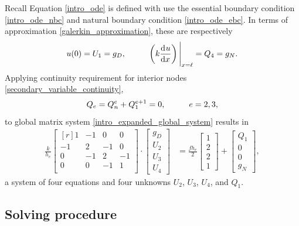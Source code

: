 Recall Equation \cref{intro_ode} is defined with use the  essential boundary condition \cref{intro_ode_nbc} and  natural boundary condition \cref{intro_ode_ebc}.  In terms of approximation \cref{galerkin_approximation}, these are respectively
$$u(0) = U_1 = g_D, \hspace{10mm} \left( k \totder{u}{x} \right) \Bigg|_{x=\ell} = Q_4 = g_N.$$
Applying continuity requirement for interior nodes \cref{secondary_variable_continuity},
$$Q_e = Q_n^e + Q_1^{e+1} = 0, \hspace{10mm} e = 2,3,$$
to global matrix system \cref{intro_expanded_global_system} results in
\begin{align}
  \label{intro_final_global_system}
  \frac{k}{h_e}
  \begin{bmatrix}[r]
     1 & -1 &  0 &  0 \\
    -1 &  2 & -1 &  0 \\
     0 & -1 &  2 & -1 \\
     0 &  0 & -1 &  1 \\
  \end{bmatrix} \cdot
  \begin{bmatrix} g_D \\ U_2 \\ U_3 \\ U_4 \end{bmatrix} &=
  \frac{f h_e}{2}
  \begin{bmatrix} 1   \\ 2   \\ 2   \\ 1   \end{bmatrix} +
  \begin{bmatrix} Q_1 \\ 0   \\ 0   \\ g_N   \end{bmatrix},
\end{align}
a system of four equations and four unknowns $U_2$, $U_3$, $U_4$, and $Q_1$.

\subsection{Solving procedure} \label{ssn_galerkin_solve}

